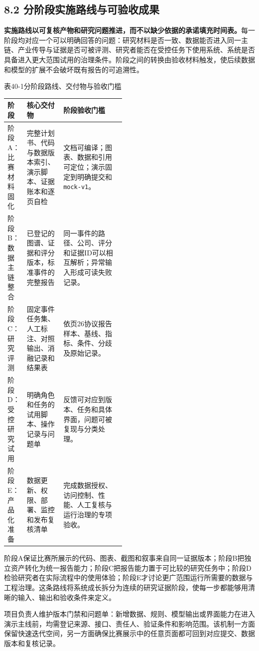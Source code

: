 \subsection*{8.2 分阶段实施路线与可验收成果}\label{page:40}
\noindent\textbf{实施路线以可复核产物和研究问题推进，而不以缺少依据的承诺填充时间表。}每一阶段均对应一个可以明确回答的问题：研究材料是否一致、数据能否进入同一主链、产业传导与证据是否可被评测、研究者能否在受控任务下使用系统、系统是否具备进入更大范围试用的治理条件。阶段之间的转换由验收材料触发，使后续数据和模型的扩展不会破坏既有报告的可追溯性。

\begin{center}\small 表40-1\quad 分阶段路线、交付物与验收门槛\par\vspace{1mm}
\begin{tabularx}{\linewidth}{p{0.16\linewidth}p{0.31\linewidth}X}
\toprule
阶段 & 核心交付物 & 阶段验收门槛\\
\midrule
阶段A：比赛材料固化 & 完整计划书、代码与数据版本索引、演示脚本、证据账本和逐页自检 & 文档可编译；图表、数据和引用可定位；演示固定到明确提交和\texttt{mock-v1}。\\
阶段B：数据主链整合 & 已登记的图谱、证据和评分版本，标准事件的完整报告 & 同一事件的路径、公司、评分和证据ID可以相互解析；异常输入形成可读失败记录。\\
阶段C：研究评测 & 固定事件任务集、人工标注、对照输出、消融记录和结果表 & 依页26协议报告样本、基线、指标、条件、分歧及原始记录。\\
阶段D：受控研究试用 & 明确角色和任务的试用脚本、操作记录与问题单 & 反馈可对应到版本、任务和具体界面，问题可被复现与分类处理。\\
阶段E：产品化准备 & 数据更新、权限、部署、监控和发布复核清单 & 完成数据授权、访问控制、性能、人工复核与运行治理的专项验收。\\
\bottomrule
\end{tabularx}\end{center}

阶段A保证比赛所展示的代码、图表、截图和叙事来自同一证据版本；阶段B把独立资产转化为统一报告能力；阶段C把报告能力置于可比较的研究任务中；阶段D检验研究者在实际流程中的使用体验；阶段E才讨论更广范围运行所需要的数据与工程治理。这条路线将系统成长拆分为连续的研究证据阶段，使每一步都能够用清晰的输入、输出和验收条件来定义。

项目负责人维护版本门禁和问题单：新增数据、规则、模型输出或界面能力在进入演示主线前，均需登记来源、接口、责任人、验证条件和影响范围。该机制一方面保留快速迭代空间，另一方面确保比赛展示中的任意页面都可回到对应提交、数据版本和复核记录。
